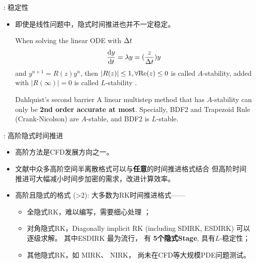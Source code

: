 \documentclass[aspectratio=169,serif]{beamer} %
\begin{document}
\begin{frame}{\secname: 稳定性}
  \begin{itemize}
    \item 即使是线性问题中，隐式时间推进也并不一定稳定。
          \begin{block}{}
            When solving the linear ODE with ${\Delta} t$
            $$
              \dv{y}{t} = \lambda y = (\frac{z}{{\Delta} t})y
            $$
            and $y^{n+1}=R(z) y^{n}$, then $|R(z)|\leq1, \forall \mathrm{Re}(z)\leq 0$ is
            called $A$-stability, added with $|R(\infty)|=0$ is called $L$-stability
            \cite{wanner1996solving}.
          \end{block}
          \begin{block}{Dahlquist's second barrier
              \cite{dahlquist1963special}}
            A linear multistep method that has $A$-stability
            can only be {\bf 2nd order accurate at most}.
            Specially, BDF2 and Trapezoid Rule (Crank-Nicolson)
            are $A$-stable, and BDF2 is $L$-stable.
          \end{block}
  \end{itemize}
\end{frame}

\begin{frame}{\secname: 高阶隐式时间推进}
  \begin{itemize}
    \item 高阶方法是CFD发展方向之一\cite{cheng2009highHOReview}。
    \item 文献中众多高阶空间半离散格式可以与{\bf 任意}的时间推进格式结合
          但高阶时间推进可大幅减小时间步加密的需求，改进计算效率。
    \item 高阶且隐式的格式 (>2): 大多数为RK时间推进格式——
          \begin{itemize}
            \item 全隐式RK，难以编写，需要细心处理
                  \cite{pazner2017stage,jameson2017evaluation}；
            \item 对角隐式RK，Diagonally implicit RK
                  (including SDIRK, ESDIRK) 可以逐级求解。
                  其中ESDIRK \cite{kennedy2003additiveARK,kvaerno2004singly}最为流行，
                  有 {\bf 5个隐式Stage}, 具有$L$-稳定性；
            \item 其他隐式RK，如 MIRK、 NIRK，
                  \cite{cash1975classMIRKOrig,kulikov2006familyNIRKOrig}
                  尚未在CFD等大规模PDE问题测试。
          \end{itemize}
  \end{itemize}
\end{frame}
\end{document}
